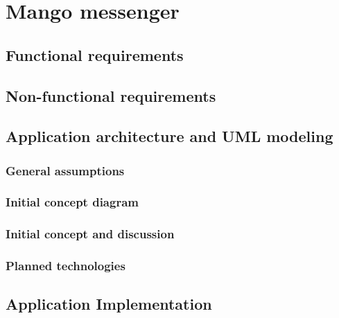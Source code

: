 \chapter{Mango messenger}\label{ch:mango-messenger}


\section{Functional requirements}\label{sec:functional-requirements}


\section{Non-functional requirements}\label{sec:non-functional-requirements}


\section{Application architecture and UML modeling}\label{sec:application-architecture-and-uml-modeling}

\subsection{General assumptions}\label{subsec:general-assumptions}

\subsection{Initial concept diagram}\label{subsec:initial-concept-diagram}

\subsection{Initial concept and discussion}\label{subsec:initial-concept-and-discussion}

\subsection{Planned technologies}\label{subsec:planned-technologies}


\section{Application Implementation}\label{sec:implementation}